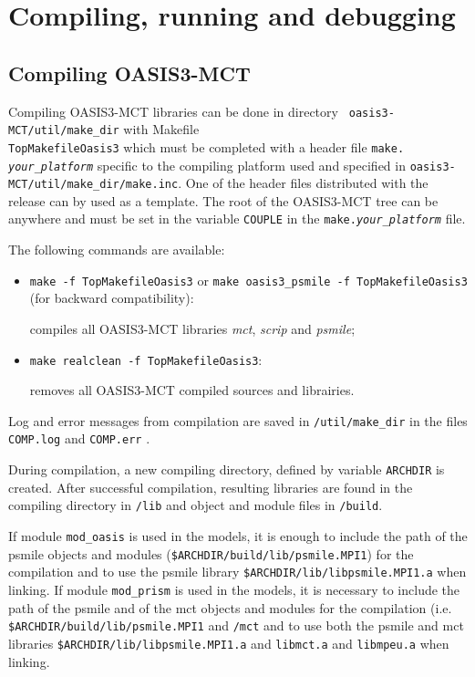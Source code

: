 \newpage
%

\chapter{Compiling, running and debugging}
\label{sec_compilationrunning}

\section{Compiling OASIS3-MCT}
\label{subsec_compile}

Compiling OASIS3-MCT libraries can be done in directory {\tt
  oasis3-MCT/util/make\_dir} with Makefile \\ {\tt TopMakefileOasis3}
which must be completed with a header file {\tt make.{\it
    your\_platform}} specific to the compiling platform used and
specified in {\tt oasis3-MCT/util/make\_dir/make.inc}.  One of the
header files distributed with the release can by used as a template.
The root of the OASIS3-MCT tree can be anywhere and must be set in the
variable {\tt COUPLE} in the {\tt make.{\it your\_platform}} file.

The following commands are available:

\begin{itemize}
\item {\tt make -f TopMakefileOasis3} or {\tt make oasis3\_psmile -f
    TopMakefileOasis3} (for backward compatibility):

  compiles all OASIS3-MCT libraries {\it mct}, {\it scrip} and {\it
    psmile};

\item {\tt make realclean -f TopMakefileOasis3}:

  removes all OASIS3-MCT compiled sources and librairies.

\end{itemize}

Log and error messages from compilation are saved in {\tt /util/make\_dir} in the files
{\tt COMP.log} and {\tt COMP.err} .

During compilation, a new compiling directory, defined by variable
{\tt ARCHDIR} is created.  After successful compilation, resulting
libraries are found in the compiling directory in {\tt /lib} and
object and module files in {\tt /build}. 

If module {\tt mod\_oasis} is used in the
models, it is enough to include the path of the psmile objects and
modules ({\tt \$ARCHDIR/build/lib/psmile.MPI1}) for the compilation and to use the psmile library {\tt \$ARCHDIR/lib/libpsmile.MPI1.a} when
linking. If module {\tt mod\_prism} is used in the models, it is necessary to
include the path of the psmile and of the mct objects and modules for
the compilation (i.e. {\tt \$ARCHDIR/build/lib/psmile.MPI1} and {\tt /mct} and to use both the psmile and mct libraries {\tt \$ARCHDIR/lib/libpsmile.MPI1.a} and {\tt libmct.a} and {\tt libmpeu.a} when linking.

